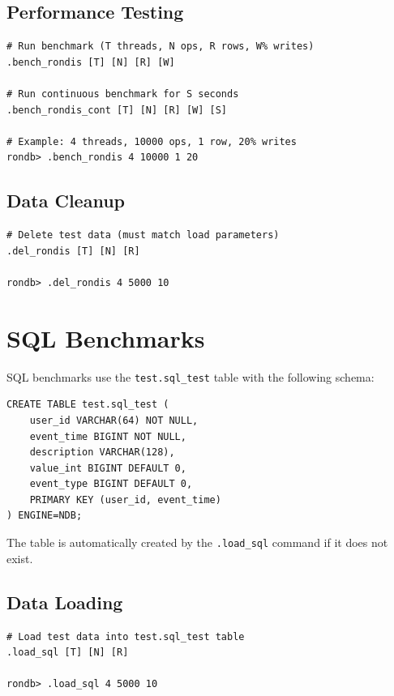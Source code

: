\documentclass[11pt,a4paper]{report}
\begin{document}
\subsection{Performance Testing}

\begin{lstlisting}[language=rondb]
# Run benchmark (T threads, N ops, R rows, W% writes)
.bench_rondis [T] [N] [R] [W]

# Run continuous benchmark for S seconds
.bench_rondis_cont [T] [N] [R] [W] [S]

# Example: 4 threads, 10000 ops, 1 row, 20% writes
rondb> .bench_rondis 4 10000 1 20
\end{lstlisting}

\subsection{Data Cleanup}

\begin{lstlisting}[language=rondb]
# Delete test data (must match load parameters)
.del_rondis [T] [N] [R]

rondb> .del_rondis 4 5000 10
\end{lstlisting}

\section{SQL Benchmarks}

SQL benchmarks use the \texttt{test.sql\_test} table with the following schema:

\begin{lstlisting}[language=rondb]
CREATE TABLE test.sql_test (
    user_id VARCHAR(64) NOT NULL,
    event_time BIGINT NOT NULL,
    description VARCHAR(128),
    value_int BIGINT DEFAULT 0,
    event_type BIGINT DEFAULT 0,
    PRIMARY KEY (user_id, event_time)
) ENGINE=NDB;
\end{lstlisting}

The table is automatically created by the \texttt{.load\_sql} command if it does not exist.

\subsection{Data Loading}

\begin{lstlisting}[language=rondb]
# Load test data into test.sql_test table
.load_sql [T] [N] [R]

rondb> .load_sql 4 5000 10
\end{lstlisting}
\end{document}
